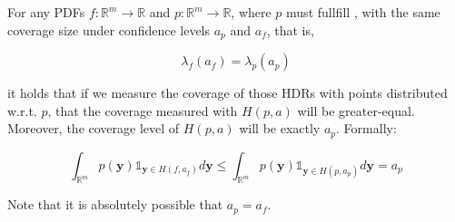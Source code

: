 \begin{lemma}\label{lem:hdr_optimality_mll}
    For any PDFs $f: \mathbb{R}^m \to \mathbb{R}$ and $p: \mathbb{R}^m \to \mathbb{R}$, where $p$ must fullfill , with the same coverage size under confidence levels $a_p$ and $a_f$, that is,

    \[\lambda_f(a_f) = \lambda_p(a_p)\]

    it holds that if we measure the coverage of those HDRs with points distributed w.r.t. $p$, that the coverage measured with $H(p,a)$ will be greater-equal. Moreover, the coverage level of $H(p,a)$ will be exactly $a_p$. Formally:

    \[
        \int_{\mathbb{R}^{m}} p(\mathbf{y}) \mathds1_{\mathbf{y} \in H(f, a_f)} d
        \mathbf{y} \leq \int_{\mathbb{R}^{m}} p(\mathbf{y})
        \mathds1_{\mathbf{y} \in
            H(p, a_p)} d \mathbf{y} = a_p
    \]
\end{lemma}
Note that it is absolutely possible that $a_p = a_f$.
